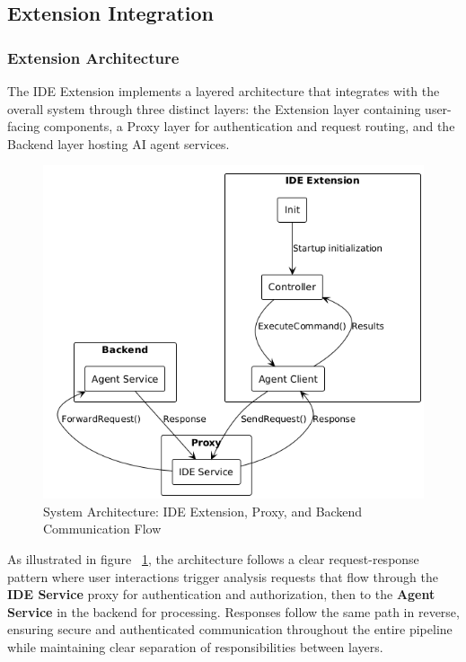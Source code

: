 \begin{spacing}{1.2}
\subsection{Extension Integration}

\subsubsection{Extension Architecture}
The IDE Extension implements a layered architecture that integrates with the overall system through three distinct layers: the Extension layer containing user-facing components, a Proxy layer for authentication and request routing, and the Backend layer hosting AI agent services.

\begin{figure}[H]
    \centering
    \includegraphics[scale=0.6]{Images/extension_integration.png}
    \caption{System Architecture: IDE Extension, Proxy, and Backend Communication Flow}
    \label{fig:high_level_frontend_architecture}
\end{figure}

As illustrated in figure ~\ref{fig:high_level_frontend_architecture}, the architecture follows a clear request-response pattern where user interactions trigger analysis requests that flow through the \textbf{IDE Service} proxy for authentication and authorization, then to the \textbf{Agent Service} in the backend for processing. Responses follow the same path in reverse, ensuring secure and authenticated communication throughout the entire pipeline while maintaining clear separation of responsibilities between layers.


\end{spacing}
